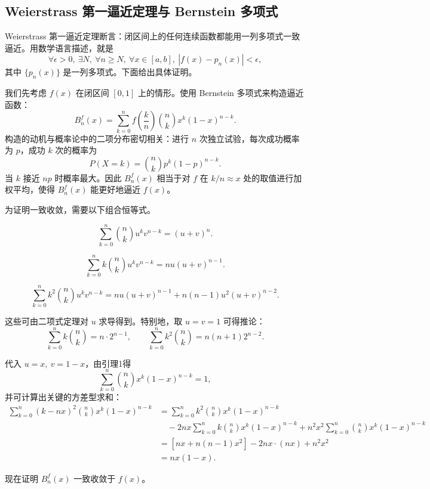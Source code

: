 \subsection{Weierstrass 第一逼近定理与 Bernstein 多项式}

Weierstrass 第一逼近定理断言：闭区间上的任何连续函数都能用一列多项式一致逼近。用数学语言描述，就是
\[
\forall \epsilon > 0,\ \exists N,\ \forall n \geq N,\ \forall x \in [a, b],\ |f(x) - p_n(x)| < \epsilon,
\]
其中 $\{p_n(x)\}$ 是一列多项式。下面给出具体证明。

我们先考虑 $f(x)$ 在闭区间 $[0,1]$ 上的情形。使用 Bernstein 多项式来构造逼近函数：
\[
B_n^f(x) = \sum_{k=0}^{n} f\left(\frac{k}{n}\right) \binom{n}{k} x^k (1-x)^{n-k}.
\]
构造的动机与概率论中的二项分布密切相关：进行 $n$ 次独立试验，每次成功概率为 $p$，成功 $k$ 次的概率为
\[
P(X = k) = \binom{n}{k} p^k (1-p)^{n-k}.
\]
当 $k$ 接近 $np$ 时概率最大。因此 $B_n^f(x)$ 相当于对 $f$ 在 $k/n\approx x$ 处的取值进行加权平均，使得 $B_n^f(x)$ 能更好地逼近 $f(x)$。

为证明一致收敛，需要以下组合恒等式。

\begin{lemma}
\[
\sum_{k=0}^{n} \binom{n}{k} u^k v^{n-k} = (u + v)^n.
\]
\end{lemma}
\begin{lemma}
\[
\sum_{k=0}^{n} k \binom{n}{k} u^k v^{n-k} = nu(u + v)^{n-1}.
\]
\end{lemma}
\begin{lemma}
\[
\sum_{k=0}^{n} k^2 \binom{n}{k} u^k v^{n-k} = nu(u+v)^{n-1} + n(n-1)u^2(u+v)^{n-2}.
\]
\end{lemma}

这些可由二项式定理对 $u$ 求导得到。特别地，取 $u=v=1$ 可得推论：
\[
\sum_{k=0}^{n} k \binom{n}{k} = n \cdot 2^{n-1},\qquad
\sum_{k=0}^{n} k^2 \binom{n}{k} = n(n+1)2^{n-2}.
\]

代入 $u=x,\ v=1-x$，由引理1得
\[
\sum_{k=0}^{n} \binom{n}{k} x^k (1-x)^{n-k} = 1,
\]
并可计算出关键的方差型求和：
\begin{align*}
\sum_{k=0}^{n} (k-nx)^2 \binom{n}{k} x^k (1-x)^{n-k}
&= \sum_{k=0}^{n} k^2 \binom{n}{k} x^k (1-x)^{n-k} \\
&\quad - 2nx\sum_{k=0}^{n} k\binom{n}{k}x^k(1-x)^{n-k} + n^2x^2\sum_{k=0}^{n}\binom{n}{k}x^k(1-x)^{n-k} \\
&= [nx + n(n-1)x^2] - 2nx\cdot(nx) + n^2x^2 \\
&= nx(1-x).
\end{align*}

现在证明 $B_n^f(x)$ 一致收敛于 $f(x)$。

